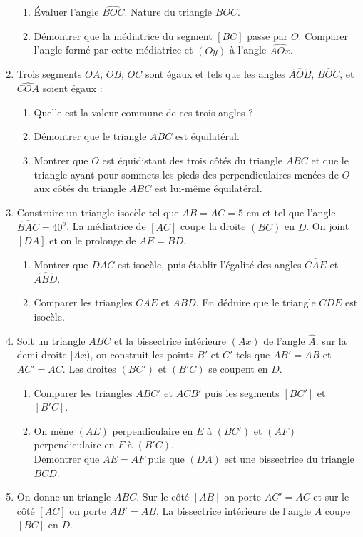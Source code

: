 \documentclass[12 pt]{report}
\theoremstyle{plain}
\newcounter{n}
\begin{document}
\begin{enumerate}
\begin{enumerate}
 \item Évaluer l'angle $\widehat{BOC}$. Nature du triangle $BOC$.
 \item Démontrer que la médiatrice du segment $[BC]$ passe par $O$. Comparer l'angle
 formé par cette médiatrice et $(Oy)$ à l'angle $\widehat{AOx}$. 
 \end{enumerate}
 \item Trois segments $OA$, $OB$, $OC$ sont égaux et tels que les angles $\widehat{AOB}$, $\widehat{BOC}$, et $\widehat{COA}$ soient égaux :  \begin{enumerate}
 \item Quelle est la valeur commune de ces trois angles ? 
 \item Démontrer que le triangle $ABC$ est équilatéral. 
 \item Montrer que $O$ est équidistant des trois côtés du triangle $ABC$ et que
 le triangle ayant pour sommets les pieds des perpendiculaires menées de $O$ 
 aux côtés du triangle $ABC$ est lui-même équilatéral.
 \end{enumerate}
 \item Construire un triangle isocèle tel que $AB=AC=5$ cm et tel que l'angle
 $\widehat{BAC}=40^o$. La médiatrice de $[AC]$ coupe la droite $(BC)$ en $D$. On joint $[DA]$ et on le prolonge de $AE=BD$.\begin{enumerate}
 \item Montrer que $DAC$ est isocèle, puis établir l'égalité des angles $\widehat{CAE}$ et $\widehat{ABD}$. 
 \item Comparer les triangles $CAE$ et $ABD$. En déduire que le triangle $CDE$ est
 isocèle.
 \end{enumerate}
 \item Soit un triangle $ABC$ et la bissectrice intérieure $(Ax)$ de l'angle
 $\widehat{A}$. sur la demi-droite $[Ax)$, on construit les points $B'$ et $C'$ tels
 que $AB'=AB$ et $AC'=AC$. Les droites $(BC')$ et $(B'C)$ se coupent en $D$. \begin{enumerate}
 \item Comparer les triangles $ABC'$ et $ACB'$ puis les segments $[BC']$ et $[B'C]$.
 \item On mène $(AE)$ perpendiculaire en $E$ à $(BC')$ et $(AF)$ perpendiculaire en $F$ à $(B'C)$. \\ Demontrer que $AE=AF$ puis que $(DA)$ est une bissectrice du triangle $BCD$.
 \end{enumerate}
 \item On donne un triangle $ABC$. Sur le côté $[AB]$ on porte $AC'=AC$ et sur le côté $[AC]$ on porte $AB'=AB$. La bissectrice intérieure de l'angle $A$ coupe $[BC]$ en $D$.\begin{enumerate}

\end{enumerate}
\end{enumerate}
\end{document}
